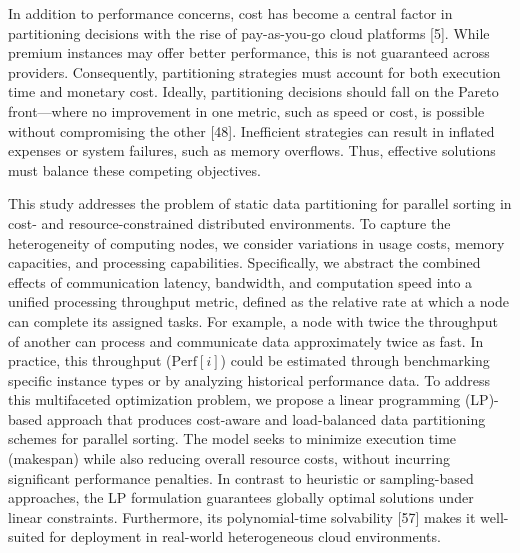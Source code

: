 \documentclass[]{interact}
\theoremstyle{plain}
\theoremstyle{definition}
\theoremstyle{remark}
\begin{document}
In addition to performance concerns, cost has become a central factor in partitioning decisions with the rise of pay-as-you-go cloud platforms [5]. While premium instances may offer better performance, this is not guaranteed across providers. Consequently, partitioning strategies must account for both execution time and monetary cost. Ideally, partitioning decisions should fall on the Pareto front—where no improvement in one metric, such as speed or cost, is possible without compromising the other [48]. Inefficient strategies can result in inflated expenses or system failures, such as memory overflows. Thus, effective solutions must balance these competing objectives.

This study addresses the problem of static data partitioning for parallel sorting in cost- and resource-constrained distributed environments. To capture the heterogeneity of computing nodes, we consider variations in usage costs, memory capacities, and processing capabilities. Specifically, we abstract the combined effects of communication latency, bandwidth, and computation speed into a unified processing throughput metric, defined as the relative rate at which a node can complete its assigned tasks. For example, a node with twice the throughput of another can process and communicate data approximately twice as fast. In practice, this throughput ($\text{Perf}[i]$) could be estimated through benchmarking specific instance types or by analyzing historical performance data. To address this multifaceted optimization problem, we propose a linear programming (LP)-based approach that produces cost-aware and load-balanced data partitioning schemes for parallel sorting. The model seeks to minimize execution time (makespan) while also reducing overall resource costs, without incurring significant performance penalties. In contrast to heuristic or sampling-based approaches, the LP formulation guarantees globally optimal solutions under linear constraints. Furthermore, its polynomial-time solvability [57] makes it well-suited for deployment in real-world heterogeneous cloud environments.
\end{document}
